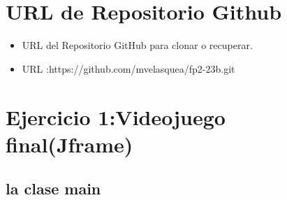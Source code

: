 \documentclass{article}
\begin{document}
	\section{URL de Repositorio Github}
	\begin{itemize}
		\item URL del Repositorio GitHub para clonar o recuperar.
			\item URL :https://github.com/mvelasquea/fp2-23b.git

	\end{itemize}
	
	\section{Ejercicio 1:Videojuego final(Jframe)}
	
	\subsection{la clase main}
		
\end{document}
